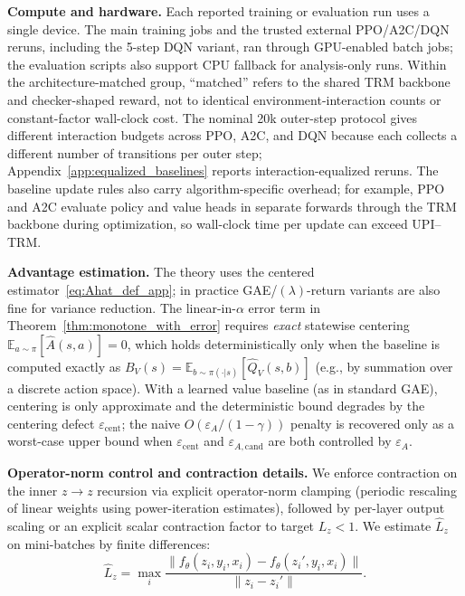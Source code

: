 \documentclass{article}
\theoremstyle{plain}
\theoremstyle{definition}
\theoremstyle{remark}
\newcommand{\E}{\mathbb{E}}
\begin{document}
\textbf{Compute and hardware.}
Each reported training or evaluation run uses a single device. The main training jobs and the trusted external PPO/A2C/DQN reruns, including the 5-step DQN variant, ran through GPU-enabled batch jobs; the evaluation scripts also support CPU fallback for analysis-only runs. Within the architecture-matched group, ``matched'' refers to the shared TRM backbone and checker-shaped reward, not to identical environment-interaction counts or constant-factor wall-clock cost. The nominal 20k outer-step protocol gives different interaction budgets across PPO, A2C, and DQN because each collects a different number of transitions per outer step; Appendix~\ref{app:equalized_baselines} reports interaction-equalized reruns. The baseline update rules also carry algorithm-specific overhead; for example, PPO and A2C evaluate policy and value heads in separate forwards through the TRM backbone during optimization, so wall-clock time per update can exceed UPI--TRM.

\textbf{Advantage estimation.}
The theory uses the centered estimator~\eqref{eq:Ahat_def_app}; in practice GAE/$(\lambda)$-return variants are also fine for variance reduction. The linear-in-$\alpha$ error term in Theorem~\ref{thm:monotone_with_error} requires \emph{exact} statewise centering $\E_{a\sim\pi}[\widehat{A}(s,a)]=0$, which holds deterministically only when the baseline is computed exactly as $B_V(s)=\E_{b\sim\pi(\cdot|s)}[\widehat Q_V(s,b)]$ (e.g., by summation over a discrete action space). With a learned value baseline (as in standard GAE), centering is only approximate and the deterministic bound degrades by the centering defect $\varepsilon_{\mathrm{cent}}$; the naive $O(\varepsilon_A/(1-\gamma))$ penalty is recovered only as a worst-case upper bound when $\varepsilon_{\mathrm{cent}}$ and $\varepsilon_{A,\mathrm{cand}}$ are both controlled by $\varepsilon_A$.

\textbf{Operator-norm control and contraction details.}
We enforce contraction on the inner $z\!\to\!z$ recursion via explicit operator-norm clamping (periodic rescaling of linear weights using power-iteration estimates), followed by per-layer output scaling or an explicit scalar contraction factor to target $L_z<1$. We estimate $\hat L_z$ on mini-batches by finite differences:
\[
\hat L_z = \max_i \frac{\|f_\theta(z_i,y_i,x_i) - f_\theta(z_i',y_i,x_i)\|}{\|z_i - z_i'\|}.
\]
\end{document}
